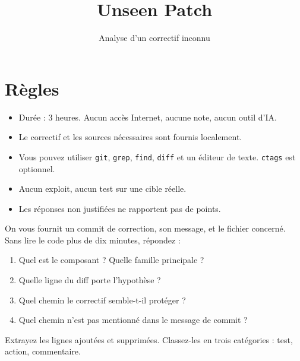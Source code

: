 \documentclass{training-exam}
\begin{document}
\title{Unseen Patch}
\subtitle{Analyse d'un correctif inconnu}
\maketitle

\startexam

\chapter{Règles}

\begin{itemize}
  \item Durée : 3 heures. Aucun accès Internet, aucune note, aucun outil
        d'IA.
  \item Le correctif et les sources nécessaires sont fournis localement.
  \item Vous pouvez utiliser \texttt{git}, \texttt{grep}, \texttt{find},
        \texttt{diff} et un éditeur de texte. \texttt{ctags} est optionnel.
  \item Aucun exploit, aucun test sur une cible réelle.
  \item Les réponses non justifiées ne rapportent pas de points.
\end{itemize}


On vous fournit un commit de correction, son message, et le fichier
concerné. Sans lire le code plus de dix minutes, répondez :

\begin{enumerate}
  \item Quel est le composant ? Quelle famille principale ?
  \item Quelle ligne du diff porte l'hypothèse ?
  \item Quel chemin le correctif semble-t-il protéger ?
  \item Quel chemin n'est pas mentionné dans le message de commit ?
\end{enumerate}



Extrayez les lignes ajoutées et supprimées. Classez-les en trois
catégories : test, action, commentaire.
\end{document}
